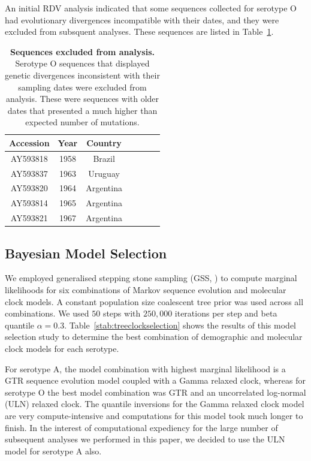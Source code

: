 \documentclass[a4paper,10pt]{article}
\begin{document}
An initial RDV analysis indicated that some sequences collected for serotype O had evolutionary divergences incompatible with their dates, and they were excluded from subsquent analyses.
These sequences are listed in Table~\ref{stab:exclseqs}.

\begin{table}[H]
\caption{\textbf{Sequences excluded from analysis.}
Serotype O sequences that displayed genetic divergences inconsistent with their sampling dates were excluded from analysis.
These were sequences with older dates that presented a much higher than expected number of mutations.
}
\begin{center}
\begin{tabular}{ccccccc}
\toprule
Accession & Year & Country \\      
\midrule
AY593818 & 1958 & Brazil \\
AY593837 & 1963 & Uruguay \\ 
AY593820 & 1964 & Argentina  \\
AY593814 & 1965 & Argentina \\
AY593821 & 1967 & Argentina \\
\bottomrule
\end{tabular}
\end{center}
\begin{flushleft}
\end{flushleft}
\label{stab:exclseqs}
 \end{table}

 
\subsection*{Bayesian Model Selection}

We employed generalised stepping stone sampling (GSS, \cite{M-Baele2015}) to compute marginal likelihoods for six combinations of Markov sequence evolution and molecular clock models.
A constant population size coalescent tree prior was used across all combinations.
We used $50$ steps with $250, 000$ iterations per step and beta quantile $\alpha = 0.3$.
Table~\ref{stab:treeclockselection} shows the results of this model selection study to determine the best combination of demographic and molecular clock models for each serotype.

For serotype A, the model combination with highest marginal likelihood is a GTR sequence evolution model coupled with a Gamma relaxed clock, whereas for serotype O the best model combination was GTR and an uncorrelated log-normal (ULN) relaxed clock.
The quantile inversions for the Gamma relaxed clock model are very compute-intensive and computations for this model took much longer to finish.
In the interest of computational  expediency for the large number of subsequent analyses we performed in this paper, we decided to use the ULN model for serotype A also.
\end{document}
